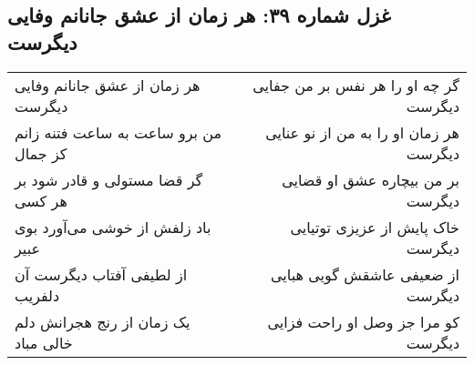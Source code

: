 \begin{center}
\section*{غزل شماره ۳۹: هر زمان از عشق جانانم وفایی دیگرست}
\label{sec:039}
\begin{longtable}{l p{0.5cm} r}
هر زمان از عشق جانانم وفایی دیگرست
&&
گر چه او را هر نفس بر من جفایی دیگرست
\\
من برو ساعت به ساعت فتنه زانم کز جمال
&&
هر زمان او را به من از نو عنایی دیگرست
\\
گر قضا مستولی و قادر شود بر هر کسی
&&
بر من بیچاره عشق او قضایی دیگرست
\\
باد زلفش از خوشی می‌آورد بوی عبیر
&&
خاک پایش از عزیزی توتیایی دیگرست
\\
از لطیفی آفتاب دیگرست آن دلفریب
&&
از ضعیفی عاشقش گویی هبایی دیگرست
\\
یک زمان از رنج هجرانش دلم خالی مباد
&&
کو مرا جز وصل او راحت فزایی دیگرست
\\
\end{longtable}
\end{center}
